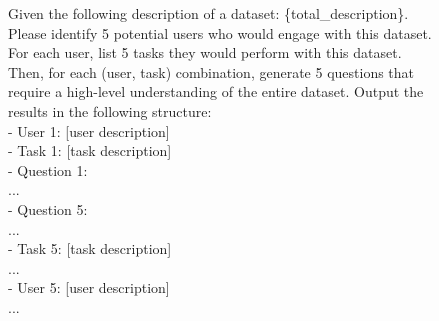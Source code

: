 \documentclass[11pt]{article}
\begin{document}
\begin{figure}[h]
\centering
\small
\begin{tcolorbox}[title=Prompt of question generation, colframe=gray, colback=white]
    Given the following description of a dataset: \{total\_description\}.
    Please identify 5 potential users who would engage with this dataset. For each user, list 5 tasks they would perform with this dataset. Then, for each (user, task) combination, generate 5 questions that require a high-level understanding of the entire dataset.
    Output the results in the following structure:\\
    - User 1: [user description]\\
        \hspace*{2em}- Task 1: [task description]\\
            \hspace*{4em}- Question 1:\\
            \hspace*{4em}...\\
            \hspace*{4em}- Question 5:\\
        \hspace*{2em}...\\
        \hspace*{2em}- Task 5: [task description]\\
    ...\\
    - User 5: [user description]\\
        \hspace*{2em}...
\end{tcolorbox}
\end{figure}
\end{document}
